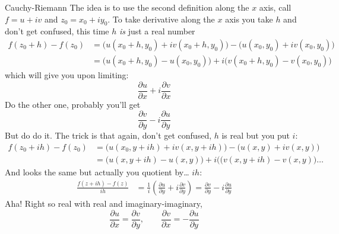 \begin{thing7}{Cauchy-Riemann}\leavevmode
The idea is to use the second definition along the \(x\) axis, call \(f=u+iv\) and  \(z_0=x_0+iy_0\). To take derivative along the \(x\) axis you take \(h\) and don't get confused, this time \(h\) \textit{is} just a real number
\begin{align*}f(z_0+h)-f(z_0)&=\Big(u(x_0+h,y_0)+iv(x_0+h,y_0)\Big)-\Big(u(x_0,y_0)+iv(x_0,y_0)\Big)\\
&=\Big(u(x_0+h,y_0)-u(x_0,y_0)\Big)+i\Big(v(x_0+h,y_0)-v(x_0,y_0)\Big)
\end{align*}
which will give you upon limiting:
\[\frac{\partial u}{\partial x}+i\frac{\partial v}{\partial x}\]
Do the other one, probably you'll get
\[\frac{\partial v}{\partial y}-i\frac{\partial u}{\partial y}\]
But do do it. The trick is that again, don't get confused, \(h\) is real but you put \(i\):
\begin{align*}
f(z_0+ih)-f(z_0)&=\Big(u(x_0,y+ih)+iv(x,y+ih)\Big)-\Big(u(x,y)+iv(x,y)\Big)\\
&=\Big(u(x,y+ih)-u(x,y)\Big)+i\Big((v(x,y+ih)-v(x,y)\Big)\ldots
\end{align*}
And looks the same but actually you quotient by… \(ih\):
\begin{align*}\frac{f(z+ih)-f(z)}{ih}&=\frac{1}{i}\left(\frac{\partial u}{\partial y}+i\frac{\partial v}{\partial y}\right)=\frac{\partial v}{\partial y}-i\frac{\partial u}{\partial y}
	\end{align*}
Aha! Right so real with real and imaginary-imaginary,
\[\frac{\partial u}{\partial x}=\frac{\partial v}{\partial y},\qquad \frac{\partial v}{\partial x}=-\frac{\partial u}{\partial y}\]
\end{thing7}







